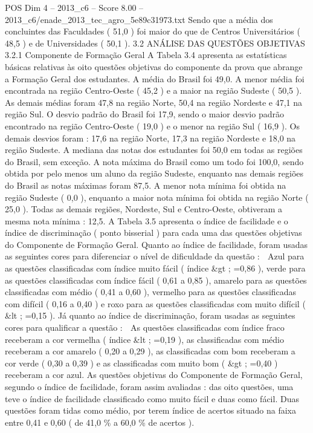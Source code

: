 \begin{textsample}{POS Dim 4 – 2013\_c6 – Score 8.00 – 2013\_c6/enade\_2013\_tec\_agro\_5e89c31973.txt}
Sendo que a média dos concluintes das Faculdades ( 51,0 ) foi maior do que de Centros Universitários ( 48,5 ) e de Universidades ( 50,1 ). 3.2 ANÁLISE DAS QUESTÕES OBJETIVAS 3.2.1 Componente de Formação Geral A Tabela 3.4 apresenta as estatísticas básicas relativas às oito questões objetivas do componente da prova que abrange a Formação Geral dos estudantes.
A média do Brasil foi 49,0.
A menor média foi encontrada na região Centro-Oeste ( 45,2 ) e a maior na região Sudeste ( 50,5 ).
As demais médias foram 47,8 na região Norte, 50,4 na região Nordeste e 47,1 na região Sul.
O desvio padrão do Brasil foi 17,9, sendo o maior desvio padrão encontrado na região Centro-Oeste ( 19,0 ) e o menor na região Sul ( 16,9 ).
Os demais desvios foram : 17,6 na região Norte, 17,3 na região Nordeste e 18,0 na região Sudeste.
A mediana das notas dos estudantes foi 50,0 em todas as regiões do Brasil, sem exceção.
A nota máxima do Brasil como um todo foi 100,0, sendo obtida por pelo menos um aluno da região Sudeste, enquanto nas demais regiões do Brasil as notas máximas foram 87,5.
A menor nota mínima foi obtida na região Sudeste ( 0,0 ), enquanto a maior nota mínima foi obtida na região Norte ( 25,0 ).
Todas as demais regiões, Nordeste, Sul e Centro-Oeste, obtiveram a mesma nota mínima : 12,5.
A Tabela 3.5 apresenta o índice de facilidade e o índice de discriminação ( ponto bisserial ) para cada uma das questões objetivas do Componente de Formação Geral.
Quanto ao índice de facilidade, foram usadas as seguintes cores para diferenciar o nível de dificuldade da questão :  Azul para as questões classificadas com índice muito fácil ( índice \&gt ; =0,86 ), verde para as questões classificadas com índice fácil ( 0,61 a 0,85 ), amarelo para as questões classificadas com médio ( 0,41 a 0,60 ), vermelho para as questões classificadas com difícil ( 0,16 a 0,40 ) e roxo para as questões classificadas com muito difícil ( \&lt ; =0,15 ).
Já quanto ao índice de discriminação, foram usadas as seguintes cores para qualificar a questão :  As questões classificadas com índice fraco receberam a cor vermelha ( índice \&lt ; =0,19 ), as classificadas com médio receberam a cor amarelo ( 0,20 a 0,29 ), as classificadas com bom receberam a cor verde ( 0,30 a 0,39 ) e as classificadas com muito bom ( \&gt ; =0,40 ) receberam a cor azul.
As questões objetivas do Componente de Formação Geral, segundo o índice de facilidade, foram assim avaliadas : das oito questões, uma teve o índice de facilidade classificado como muito fácil e duas como fácil.
Duas questões foram tidas como médio, por terem índice de acertos situado na faixa entre 0,41 e 0,60 ( de 41,0 \% a 60,0 \% de acertos ).

\end{textsample}
